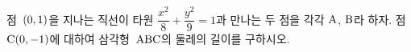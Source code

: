 점~$(0{,}\mkern3mu\mathopen{}1)$을 지나는 직선이 타원 $\dfrac{x^2}{8}+\dfrac{y^2}{9}=1$과 만나는 두 점을 각각 $\mathrm{A}$, $\mathrm{B}$라 하자. 점~$\mathrm{C}(0{,}\mkern3mu\mathopen{}-1)$에 대하여 삼각형~$\mathrm{ABC}$의 둘레의 길이를 구하시오.
